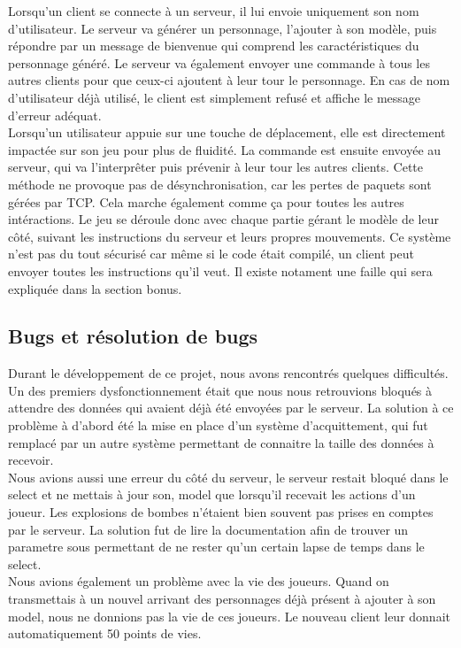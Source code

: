 \documentclass[12pt]{article}
\begin{document}
Lorsqu'un client se connecte à un serveur, il lui envoie uniquement son nom d'utilisateur. Le serveur va générer un personnage, l'ajouter à son modèle, puis répondre par un message de bienvenue qui comprend les caractéristiques du personnage généré. Le serveur va également envoyer une commande à tous les autres clients pour que ceux-ci ajoutent à leur tour le personnage. En cas de nom d'utilisateur déjà utilisé, le client est simplement refusé et affiche le message d'erreur adéquat.
\\

Lorsqu'un utilisateur appuie sur une touche de déplacement, elle est directement impactée sur son jeu pour plus de fluidité. La commande est ensuite envoyée au serveur, qui va l'interprêter puis prévenir à leur tour les autres clients. Cette méthode ne provoque pas de désynchronisation, car les pertes de paquets sont gérées par TCP. Cela marche également comme ça pour toutes les autres intéractions.
\newpage
Le jeu se déroule donc avec chaque partie gérant le modèle de leur côté, suivant les instructions du serveur et leurs propres mouvements. Ce système n'est pas du tout sécurisé car même si le code était compilé, un client peut envoyer toutes les instructions qu'il veut. Il existe notament une faille qui sera expliquée dans la section bonus.

\subsection{Bugs et résolution de bugs}
Durant le développement de ce projet, nous avons rencontrés quelques difficultés. Un des premiers dysfonctionnement était que nous nous retrouvions bloqués à attendre des données qui avaient déjà été envoyées par le serveur. La solution à ce problème à d'abord été la mise en place d'un système d'acquittement, qui fut remplacé par un autre système permettant de connaitre la taille des données à recevoir.
\\
Nous avions aussi une erreur du côté du serveur, le serveur restait bloqué dans le select et ne mettais à jour son, model que lorsqu'il recevait les actions d'un joueur. Les explosions de bombes n'étaient bien souvent pas prises en comptes par le serveur. La solution fut de lire la documentation afin de trouver un parametre sous permettant de ne rester qu'un certain lapse de temps dans le select.\\

Nous avions également un problème avec la vie des joueurs. Quand on transmettais à un nouvel arrivant des personnages déjà présent à ajouter à son model, nous ne donnions pas la vie de ces joueurs. Le nouveau client leur donnait automatiquement 50 points de vies.\\
\end{document}
